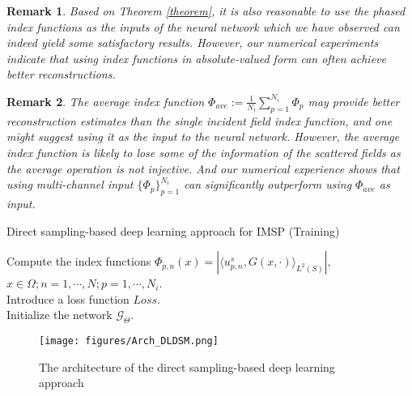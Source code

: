 \documentclass{article}
\newtheorem{remark}{Remark}
\begin{document}
    
    \begin{remark}
    	Based on Theorem \ref{theorem}, it is also reasonable to use the phased index functions as the inputs of the neural network which we have observed can indeed yield some satisfactory results. However, our numerical experiments indicate that using index functions in absolute-valued form can often achieve better reconstructions. 
    \end{remark}
    \begin{remark}
    	The average index function $\Phi_{ave}:=\frac{1}{N_i}\sum_{p=1}^{N_i}\Phi_{p}$ may provide better reconstruction estimates than the single incident field index function, and one might suggest using it as the input to the neural network. However, the average index function is likely to lose some of the information of the scattered fields as the average operation is not injective. And our numerical experience shows that using multi-channel input $\{\Phi_{p}\}_{p=1}^{N_i}$ can significantly outperform using $\Phi_{ave}$ as input.
    \end{remark}
   \begin{algorithm}[t]
    	\caption{Direct sampling-based deep learning approach for IMSP (Training)}
    	\label{AlgorithmDLDSM}
   		Compute the index functions $\Phi_{p,n}(x)=|\langle u^{s}_{p,n},G(x,\cdot)\rangle_{L^{2}(S)}|$, $x\in \Omega; n=1,\cdots,N;p=1,\cdots,N_{i}$.  
   		\\Introduce a loss function $Loss$.
   		\\
   		Initialize the network $\mathcal{G}_{\Theta}$.\\
   \end{algorithm}
	\begin{figure}[htp]
		\centering
		\texttt{[image: figures/Arch\_DLDSM.png]}
		\caption{The architecture of the direct sampling-based deep learning approach}
		\label{fig:arc-DLDSM}
	\end{figure}
\end{document}
